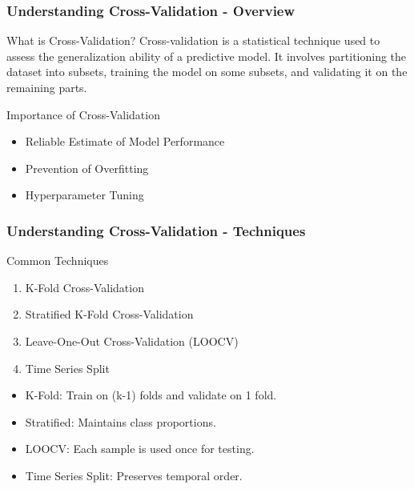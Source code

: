 \documentclass{beamer}
\begin{document}
\begin{frame}[fragile]
    \frametitle{Understanding Cross-Validation - Overview}
    \begin{block}{What is Cross-Validation?}
        Cross-validation is a statistical technique used to assess the generalization ability of a predictive model. It involves partitioning the dataset into subsets, training the model on some subsets, and validating it on the remaining parts.
    \end{block}
    \begin{block}{Importance of Cross-Validation}
        \begin{itemize}
            \item Reliable Estimate of Model Performance
            \item Prevention of Overfitting
            \item Hyperparameter Tuning
        \end{itemize}
    \end{block}
\end{frame}

\begin{frame}[fragile]
    \frametitle{Understanding Cross-Validation - Techniques}
    \begin{block}{Common Techniques}
        \begin{enumerate}
            \item K-Fold Cross-Validation
            \item Stratified K-Fold Cross-Validation
            \item Leave-One-Out Cross-Validation (LOOCV)
            \item Time Series Split
        \end{enumerate}
    \end{block}
    
    \begin{itemize}
        \item K-Fold: Train on (k-1) folds and validate on 1 fold.
        \item Stratified: Maintains class proportions.
        \item LOOCV: Each sample is used once for testing.
        \item Time Series Split: Preserves temporal order.
    \end{itemize}
\end{frame}
\end{document}
